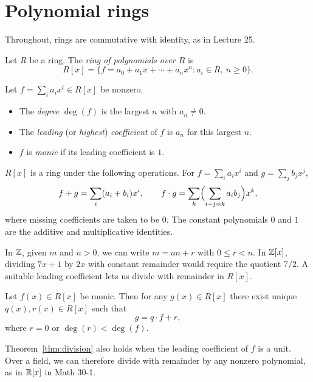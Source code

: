 \documentclass[reqno,11pt]{amsart}
\begin{document}
\raggedbottom
\makelecturetitle

\section{Polynomial rings}

Throughout, rings are commutative with identity, as in Lecture 25.

\begin{define}
Let $R$ be a ring. The \emph{ring of polynomials over $R$} is
\[
  R[x]=\{f=a_0+a_1x+\cdots+a_nx^n:a_i\in R,\ n\geq0\}.
\]
\end{define}

\begin{define}
Let $f=\sum_i a_ix^i\in R[x]$ be nonzero.
\begin{itemize}
  \item The \emph{degree} $\deg(f)$ is the largest $n$ with
    $a_n\neq0$.
  \item The \emph{leading} (or \emph{highest}) \emph{coefficient}
    of $f$ is $a_n$ for this largest $n$.
  \item $f$ is \emph{monic} if its leading coefficient is $1$.
\end{itemize}
\end{define}

\begin{proposition}
$R[x]$ is a ring under the following operations. For
$f=\sum_ia_ix^i$ and $g=\sum_jb_jx^j$,
\[
  f+g=\sum_i(a_i+b_i)x^i,\qquad
  f\cdot g=\sum_k\Bigl(\sum_{i+j=k}a_ib_j\Bigr)x^k,
\]
where missing coefficients are taken to be $0$. The constant
polynomials $0$ and $1$ are the additive and multiplicative identities.
\end{proposition}

In $\mathbb{Z}$, given $m$ and $n>0$, we can write $m=an+r$ with $0\leq r<n$.
In $\mathbb{Z}[x]$, dividing $7x+1$ by $2x$ with constant remainder would
require the quotient $7/2$. A suitable leading coefficient lets us
divide with remainder in $R[x]$.

\begin{theorem}\label{thm:division}
Let $f(x)\in R[x]$ be monic. Then for any $g(x)\in R[x]$ there exist
unique $q(x),r(x)\in R[x]$ such that
\[
  g=q\cdot f+r,
\]
where $r=0$ or $\deg(r)<\deg(f)$.
\end{theorem}

\begin{remark}
Theorem~\ref{thm:division} also holds when the leading coefficient of
$f$ is a unit. Over a field, we can therefore divide with remainder
by any nonzero polynomial, as in $\mathbb{R}[x]$ in Math 30-1.
\end{remark}
\end{document}
